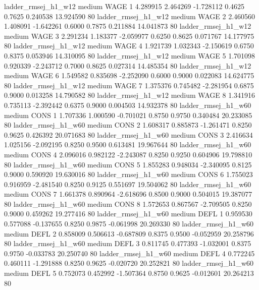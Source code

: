    ladder_rmsej_h1_w12     medium     WAGE                 1  4.289915 2.464269 -1.728112 0.4625 0.7625  0.240538   13.924590 80
   ladder_rmsej_h1_w12     medium     WAGE                 2  2.460560 1.408091 -1.642261 0.6000 0.7875  0.211884   14.041873 80
   ladder_rmsej_h1_w12     medium     WAGE                 3  2.291234 1.183377 -2.059977 0.6250 0.8625  0.071767   14.177975 80
   ladder_rmsej_h1_w12     medium     WAGE                 4  1.921739 1.032343 -2.150619 0.6750 0.8375  0.053946   14.310095 80
   ladder_rmsej_h1_w12     medium     WAGE                 5  1.701098 0.920339 -2.243712 0.7000 0.8625  0.027314   14.485354 80
   ladder_rmsej_h1_w12     medium     WAGE                 6  1.549582 0.835698 -2.252090 0.6000 0.9000  0.022083   14.624775 80
   ladder_rmsej_h1_w12     medium     WAGE                 7  1.375376 0.745482 -2.281954 0.6875 0.9000  0.013258   14.790582 80
   ladder_rmsej_h1_w12     medium     WAGE                 8  1.341916 0.735113 -2.392442 0.6375 0.9000  0.004503   14.932378 80
   ladder_rmsej_h1_w60     medium     CONS                 1  1.707336 1.000590 -0.701021 0.8750 0.9750  0.340484   20.233085 80
   ladder_rmsej_h1_w60     medium     CONS                 2  1.608317 0.885873 -1.261471 0.8250 0.9625  0.426392   20.071683 80
   ladder_rmsej_h1_w60     medium     CONS                 3  2.416634 1.025156 -2.092195 0.8250 0.9500  0.613481   19.967644 80
   ladder_rmsej_h1_w60     medium     CONS                 4  2.096016 0.982122 -2.243087 0.8250 0.9250  0.604906   19.798810 80
   ladder_rmsej_h1_w60     medium     CONS                 5  1.855283 0.948034 -2.340095 0.8125 0.9000  0.590920   19.630016 80
   ladder_rmsej_h1_w60     medium     CONS                 6  1.755023 0.916959 -2.481540 0.8250 0.9125  0.551697   19.504062 80
   ladder_rmsej_h1_w60     medium     CONS                 7  1.661378 0.890964 -2.618696 0.8500 0.9000  0.504015   19.387077 80
   ladder_rmsej_h1_w60     medium     CONS                 8  1.572653 0.867567 -2.709505 0.8250 0.9000  0.459262   19.277416 80
   ladder_rmsej_h1_w60     medium     DEFL                 1  0.959530 0.577088 -0.137655 0.8250 0.9875 -0.061998   20.269330 80
   ladder_rmsej_h1_w60     medium     DEFL                 2  0.858009 0.506613 -0.687809 0.8375 0.9500 -0.052959   20.258796 80
   ladder_rmsej_h1_w60     medium     DEFL                 3  0.811745 0.477393 -1.032001 0.8375 0.9750 -0.033783   20.250740 80
   ladder_rmsej_h1_w60     medium     DEFL                 4  0.772245 0.460111 -1.291888 0.8250 0.9625 -0.020720   20.252821 80
   ladder_rmsej_h1_w60     medium     DEFL                 5  0.752073 0.452992 -1.507364 0.8750 0.9625 -0.012601   20.264213 80
